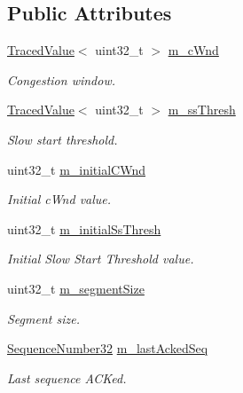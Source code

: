 \subsection*{Public Attributes}
\begin{DoxyCompactItemize}
\item 
\hyperlink{classns3_1_1TracedValue}{Traced\+Value}$<$ uint32\+\_\+t $>$ \hyperlink{classns3_1_1TcpSocketState_a7cd3d2156a483c1db436097477a0fd7f}{m\+\_\+c\+Wnd}
\begin{DoxyCompactList}\small\item\em Congestion window. \end{DoxyCompactList}\item 
\hyperlink{classns3_1_1TracedValue}{Traced\+Value}$<$ uint32\+\_\+t $>$ \hyperlink{classns3_1_1TcpSocketState_aec003b6dba9d269bfb1036c7652ffbd6}{m\+\_\+ss\+Thresh}
\begin{DoxyCompactList}\small\item\em Slow start threshold. \end{DoxyCompactList}\item 
uint32\+\_\+t \hyperlink{classns3_1_1TcpSocketState_a89931823b979729b749d93d34de9dc10}{m\+\_\+initial\+C\+Wnd}
\begin{DoxyCompactList}\small\item\em Initial c\+Wnd value. \end{DoxyCompactList}\item 
uint32\+\_\+t \hyperlink{classns3_1_1TcpSocketState_a32bb44dd7042e9ee25b5869a5a49e0bb}{m\+\_\+initial\+Ss\+Thresh}
\begin{DoxyCompactList}\small\item\em Initial Slow Start Threshold value. \end{DoxyCompactList}\item 
uint32\+\_\+t \hyperlink{classns3_1_1TcpSocketState_a079872f7b0099ef5f3cab4ff47bd2edd}{m\+\_\+segment\+Size}
\begin{DoxyCompactList}\small\item\em Segment size. \end{DoxyCompactList}\item 
\hyperlink{group__network_gacb2070e4e98d2d5135c9bede58f07a03}{Sequence\+Number32} \hyperlink{classns3_1_1TcpSocketState_a7a30ba2b675238429c7fe2f0c8d1ce94}{m\+\_\+last\+Acked\+Seq}
\begin{DoxyCompactList}\small\item\em Last sequence A\+C\+Ked. \end{DoxyCompactList}\item 

\end{DoxyCompactItemize}

